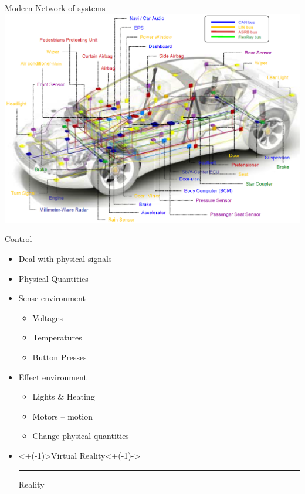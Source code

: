 \documentclass[xcolor=svgnames]{beamer}
\begin{document}
\begin{frame}{Modern Network of systems}
    \includegraphics[width=\textwidth]{CAN-car.png}
\end{frame}

\newcommand\redout{\bgroup\markoverwith
{\textcolor{red}{\rule[0.3ex]{2pt}{2pt}}}\ULon}
\begin{frame}{Control}
    \begin{itemize}[<+->]
        \item Deal with physical signals
        \item Physical Quantities
        \item Sense environment
        \begin{itemize}
          \item Voltages
          \item Temperatures
          \item Button Presses
        \end{itemize}
        \item Effect environment
        \begin{itemize}
            \item Lights \& Heating
            \item Motors -- motion
            \item Change physical quantities
        \end{itemize}
        \item \only<+(-1)>{Virtual Reality}\only<+(-1)->{\redout{Virtual} Reality}
    \end{itemize}
\end{frame}
\end{document}
